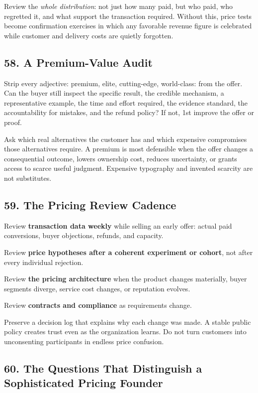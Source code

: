 Review the \emph{whole distribution}: not just how many paid, but who paid, who regretted it, and what support the transaction required. Without this, price tests become confirmation exercises in which any favorable revenue figure is celebrated while customer and delivery costs are quietly forgotten.

\subsection*{58. A Premium-Value Audit}

Strip every adjective: premium, elite, cutting-edge, world-class: from the offer. Can the buyer still inspect the specific result, the credible mechanism, a representative example, the time and effort required, the evidence standard, the accountability for mistakes, and the refund policy? If not, 1st improve the offer or proof.

Ask which real alternatives the customer has and which expensive compromises those alternatives require. A premium is most defensible when the offer changes a consequential outcome, lowers ownership cost, reduces uncertainty, or grants access to scarce useful judgment. Expensive typography and invented scarcity are not substitutes.

\subsection*{59. The Pricing Review Cadence}

Review \textbf{transaction data weekly} while selling an early offer: actual paid conversions, buyer objections, refunds, and capacity.

Review \textbf{price hypotheses after a coherent experiment or cohort}, not after every individual rejection.

Review \textbf{the pricing architecture} when the product changes materially, buyer segments diverge, service cost changes, or reputation evolves.

Review \textbf{contracts and compliance} as requirements change.

Preserve a decision log that explains why each change was made. A stable public policy creates trust even as the organization learns. Do not turn customers into unconsenting participants in endless price confusion.

\subsection*{60. The Questions That Distinguish a Sophisticated Pricing Founder}


